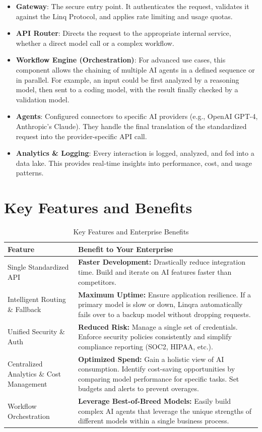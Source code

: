 \documentclass[11pt,a4paper]{article}
\begin{document}
\begin{itemize}[leftmargin=*]
  \item \textbf{Gateway}: The secure entry point. It authenticates the request, validates it against the Linq Protocol, and applies rate limiting and usage quotas.
  \item \textbf{API Router}: Directs the request to the appropriate internal service, whether a direct model call or a complex workflow.
  \item \textbf{Workflow Engine (Orchestration)}: For advanced use cases, this component allows the chaining of multiple AI agents in a defined sequence or in parallel. For example, an input could be first analyzed by a reasoning model, then sent to a coding model, with the result finally checked by a validation model.
  \item \textbf{Agents}: Configured connectors to specific AI providers (e.g., OpenAI GPT-4, Anthropic's Claude). They handle the final translation of the standardized request into the provider-specific API call.
  \item \textbf{Analytics \& Logging}: Every interaction is logged, analyzed, and fed into a data lake. This provides real-time insights into performance, cost, and usage patterns.
\end{itemize}

\newpage
\section{Key Features and Benefits}
\begin{table}[H]
\centering
\renewcommand{\arraystretch}{1.3}
\setlength{\tabcolsep}{8pt}
\begin{tabular}{p{} p{}}
\toprule
\textbf{Feature} & \textbf{Benefit to Your Enterprise} \\
\midrule
Single Standardized API & \textbf{Faster Development:} Drastically reduce integration time. Build and iterate on AI features faster than competitors. \\
Intelligent Routing \& Fallback & \textbf{Maximum Uptime:} Ensure application resilience. If a primary model is slow or down, Linqra automatically fails over to a backup model without dropping requests. \\
Unified Security \& Auth & \textbf{Reduced Risk:} Manage a single set of credentials. Enforce security policies consistently and simplify compliance reporting (SOC2, HIPAA, etc.). \\
Centralized Analytics \& Cost Management & \textbf{Optimized Spend:} Gain a holistic view of AI consumption. Identify cost-saving opportunities by comparing model performance for specific tasks. Set budgets and alerts to prevent overages. \\
Workflow Orchestration & \textbf{Leverage Best-of-Breed Models:} Easily build complex AI agents that leverage the unique strengths of different models within a single business process. \\
\bottomrule
\end{tabular}
\caption{Key Features and Enterprise Benefits}
\end{table}
\end{document}
